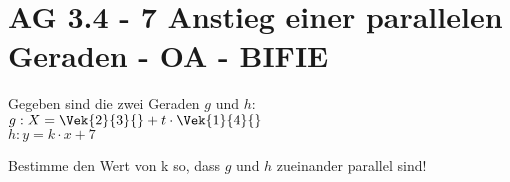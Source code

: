 \section{AG 3.4 - 7 Anstieg einer parallelen Geraden - OA - BIFIE}

\begin{beispiel}[AG 3.4]{1} %
Gegeben sind die zwei Geraden $g$ und $h$:\\

$g:X=\Vek{2}{3}{}+t\cdot\Vek{1}{4}{}$\\

$h:y=k\cdot x+7$

Bestimme den Wert von k so, dass $g$ und $h$ zueinander parallel sind!

\end{beispiel}